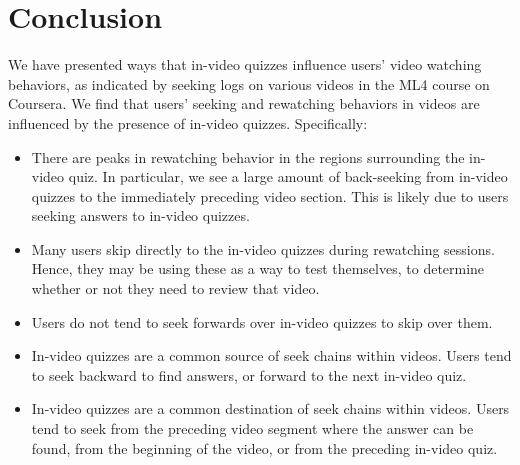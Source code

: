 \documentclass{sigchi}
\begin{document}
\section{Conclusion}

We have presented ways that in-video quizzes influence users' video watching behaviors, as indicated by seeking logs on various videos in the ML4 course on Coursera. We find that users' seeking and rewatching behaviors in videos are influenced by the presence of in-video quizzes. Specifically:

\begin{itemize}
\item There are peaks in rewatching behavior in the regions surrounding the in-video quiz. In particular, we see a large amount of back-seeking from in-video quizzes to the immediately preceding video section. This is likely due to users seeking answers to in-video quizzes.
\item Many users skip directly to the in-video quizzes during rewatching sessions. Hence, they may be using these as a way to test themselves, to determine whether or not they need to review that video. 
\item Users do not tend to seek forwards over in-video quizzes to skip over them.
\item In-video quizzes are a common source of seek chains within videos. Users tend to seek backward to find answers, or forward to the next in-video quiz.
\item In-video quizzes are a common destination of seek chains within videos. Users tend to seek from the preceding video segment where the answer can be found, from the beginning of the video, or from the preceding in-video quiz.
\end{itemize}



\end{document}
